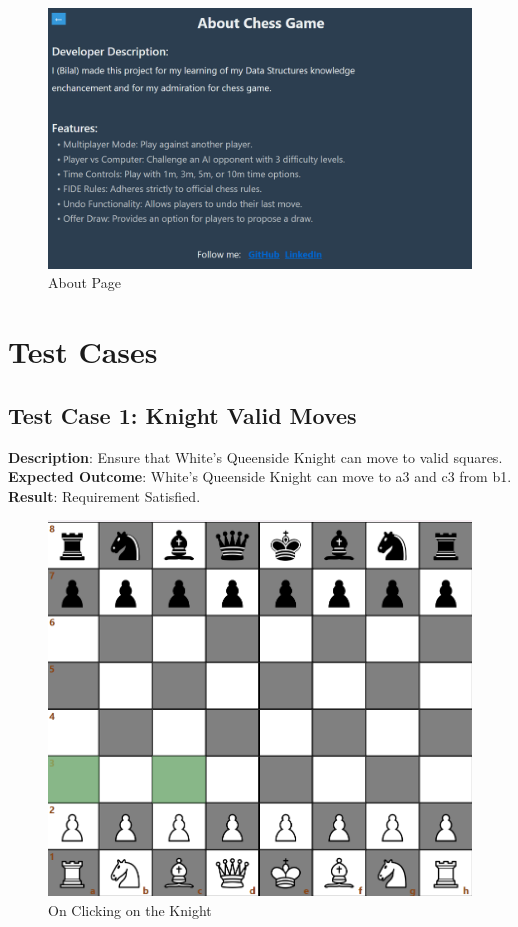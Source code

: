 \documentclass[a4paper,12pt]{article}
\begin{document}
\begin{figure}[H]
    \centering
    \includegraphics[width=0.7\linewidth]{Images/Use Cases/aboutPage.png}
    \caption{About Page}
    \label{fig:aboutPage}
\end{figure}
    
\section{Test Cases}

\subsection{Test Case 1: Knight Valid Moves}
\textbf{Description}: Ensure that White's Queenside Knight can move to valid squares.\\
\textbf{Expected Outcome}: White's Queenside Knight can move to a3 and c3 from b1.\\
\textbf{Result}: Requirement Satisfied.

\begin{figure}[H]
    \centering
    \includegraphics[width=0.6\linewidth]{Images/Test Cases/testCase1Img1.png}
    \caption{On Clicking on the Knight}
    \label{fig:BeforeKnightMove}
\end{figure}
\end{document}
